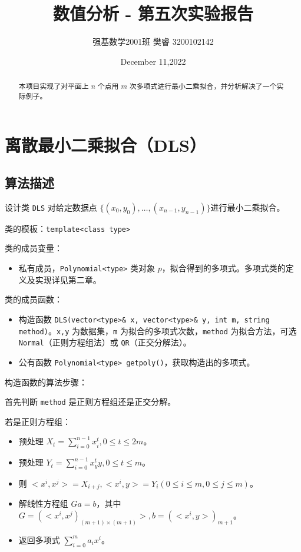 \documentclass{ctexart}
\title{数值分析 - 第五次实验报告}
\author{强基数学2001班 樊睿 3200102142}
\date{December 11,2022}
\begin{document}
\maketitle

\begin{abstract}
本项目实现了对平面上 $n$ 个点用 $m$ 次多项式进行最小二乘拟合，并分析解决了一个实际例子。
\end{abstract}


\section{离散最小二乘拟合（DLS）}

\subsection{算法描述}
设计类 \verb|DLS| 对给定数据点 $\{(x_0,y_0),\dots,(x_{n-1},y_{n-1})\}$进行最小二乘拟合。

类的模板：\verb|template<class type>|

类的成员变量：
\begin{itemize}
\item 私有成员，\verb|Polynomial<type>| 类对象 $p$，拟合得到的多项式。多项式类的定义及实现详见第二章。
\end{itemize}

类的成员函数：
\begin{itemize}
\item 构造函数 \verb|DLS(vector<type>& x, vector<type>& y, int m, string method)|。\verb|x,y| 为数据集，\verb|m| 为拟合的多项式次数，\verb|method| 为拟合方法，可选 \verb|Normal|（正则方程组法）或 \verb|QR|（正交分解法）。
\item 公有函数 \verb|Polynomial<type> getpoly()|，获取构造出的多项式。
\end{itemize}

构造函数的算法步骤：

首先判断 \verb|method| 是正则方程组还是正交分解。

若是正则方程组：
\begin{itemize}
\item 预处理 $X_t=\sum_{i=0}^{n-1}x_i^t,0\leq t\leq 2m$。
\item 预处理 $Y_t=\sum_{i=0}^{n-1}x_y^ty,0\leq t\leq m$。
\item 则 $<x^i,x^j>=X_{i+j},<x^i,y>=Y_i(0\leq i\leq m,0\leq j\leq m)$。
\item 解线性方程组 $Ga=b$，其中 $G=(<x^i,x^j)_{(m+1)\times (m+1)}>,b=(<x^i,y>)_{m+1}$。
\item 返回多项式 $\sum_{i=0}^ma_ix^i$。
\end{itemize}
\end{document}
